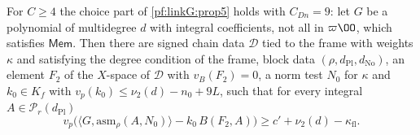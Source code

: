 \begin{theorem}\label{pf:linkG:pick}
For $C\ge4$ the choice part of \cref{pf:linkG:prop5} holds with $C_{Dn}=9$: let $G$ be a polynomial of multidegree $d$ with integral
coefficients, not all in $\varpi\OO$, which satisfies $\mathsf{Mem}$. Then there are signed chain data $\mathcal D$ tied to the frame
with weights $\kappa$ and satisfying the degree condition of the frame, block data $(\rho,d_{\mathrm{Pl}},d_{\mathrm{No}})$, an element
$F_2$ of the $X$-space of $\mathcal D$ with $v_B(F_2)=0$, a norm test $N_0$ for $\kappa$ and $k_0\in K_f$ with
$v_p(k_0)\le\nu_2(d)-n_0+9L$, such that for every integral $A\in\mathcal P_r(d_{\mathrm{Pl}})$
\[
v_p\bigl(\langle G,\mathrm{asm}_\rho(A,N_0)\rangle-k_0\,B(F_2,A)\bigr)\ge c'+\nu_2(d)-\kappa_{\mathrm{fl}} .
\]
\end{theorem}

